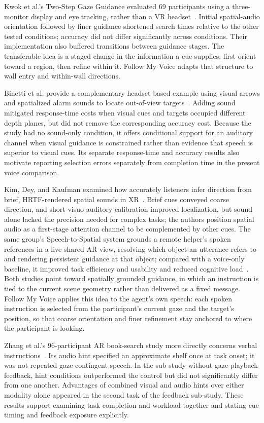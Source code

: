 Kwok et al.'s Two-Step Gaze Guidance evaluated 69 participants using a three-monitor display and eye tracking, rather than a VR headset~\cite{kwok2022twostep}. Initial spatial-audio orientation followed by finer guidance shortened search times relative to the other tested conditions; accuracy did not differ significantly across conditions. Their implementation also buffered transitions between guidance stages. The transferable idea is a staged change in the information a cue supplies: first orient toward a region, then refine within it. Follow My Voice adapts that structure to wall entry and within-wall directions.

Binetti et al. provide a complementary headset-based example using visual arrows and spatialized alarm sounds to locate out-of-view targets~\cite{binetti2021outofview}. Adding sound mitigated response-time costs when visual cues and targets occupied different depth planes, but did not remove the corresponding accuracy cost. Because the study had no sound-only condition, it offers conditional support for an auditory channel when visual guidance is constrained rather than evidence that speech is superior to visual cues. Its separate response-time and accuracy results also motivate reporting selection errors separately from completion time in the present voice comparison.

Kim, Dey, and Kaufman examined how accurately listeners infer direction from brief, HRTF-rendered spatial sounds in XR~\cite{kim2026spatialaudio}. Brief cues conveyed coarse direction, and short visuo-auditory calibration improved localization, but sound alone lacked the precision needed for complex tasks; the authors position spatial audio as a first-stage attention channel to be complemented by other cues. The same group's Speech-to-Spatial system grounds a remote helper's spoken references in a live shared AR view, resolving which object an utterance refers to and rendering persistent guidance at that object; compared with a voice-only baseline, it improved task efficiency and usability and reduced cognitive load~\cite{kim2026speechtospatial}. Both studies point toward spatially grounded guidance, in which an instruction is tied to the current scene geometry rather than delivered as a fixed message. Follow My Voice applies this idea to the agent's own speech: each spoken instruction is selected from the participant's current gaze and the target's position, so that coarse orientation and finer refinement stay anchored to where the participant is looking.

Zhang et al.'s 96-participant AR book-search study more directly concerns verbal instructions~\cite{zhang2023seehear}. Its audio hint specified an approximate shelf once at task onset; it was not repeated gaze-contingent speech. In the sub-study without gaze-playback feedback, hint conditions outperformed the control but did not significantly differ from one another. Advantages of combined visual and audio hints over either modality alone appeared in the second task of the feedback sub-study. These results support examining task completion and workload together and stating cue timing and feedback exposure explicitly.

